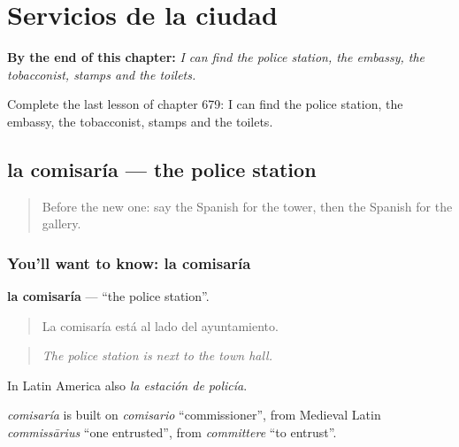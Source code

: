 
\chapter{Servicios de la ciudad}
\label{ch:es-servicios-de-la-ciudad}

\begin{chapteropening}
\textbf{By the end of this chapter:} \emph{I can find the police station, the embassy, the tobacconist, stamps and the toilets.}

Complete the last lesson of chapter 679: I can find the police station, the embassy, the tobacconist, stamps and the toilets.
\end{chapteropening}

\section[la comisaría]{la comisaría — the police station}

\label{lesson:ES-C679-comisaria}



\begin{quote}
Before the new one: say the Spanish for the tower, then the Spanish for the gallery.
\end{quote}

\subsection*{You'll want to know: la comisaría}
\textbf{la comisaría} — \textquotedblleft{}the police station\textquotedblright{}.

\begin{quote}
La comisaría está al lado del ayuntamiento.
\end{quote}

\begin{quote}
\emph{The police station is next to the town hall.}
\end{quote}

In Latin America also \emph{la estación de policía}.

\begin{cousinweb}
\emph{comisaría} is built on \emph{comisario} \textquotedblleft{}commissioner\textquotedblright{}, from Medieval Latin \emph{commissārius} \textquotedblleft{}one entrusted\textquotedblright{}, from \emph{committere} \textquotedblleft{}to entrust\textquotedblright{}.
\end{cousinweb}

